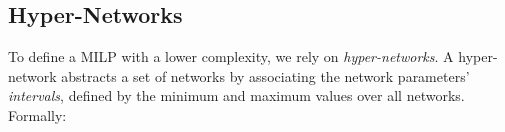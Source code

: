 \begin{comment}
Our minimal DP-DB bound is defined as the smallest bound above which no input causes the classifier $D$ to classify differently compared to any of the $|\mathcal{S}|$ classifiers $D'_{i \in [|\mathcal{S}|]}$. 
We compute this bound by addressing the dual problem identifying the maximal bound $\beta^*$ where at least one input causes classification differences, and then incrementing this by a very small number $\Delta$. This $\Delta$ represents a negligible quantity, reflecting the floating point precision. Namely, if $\beta^*$ is the maximal bound with classification differences, then $\beta^* + \Delta$ is the minimal bound without classification differences. We next formalize:

\begin{problem}[Minimal DP-DB bound]
\begin{equation}\label{problem}
  \begin{gathered}
     \max \beta^*\\%
     \text{subject to}\hspace{0.25cm}\hspace{6.1cm} \\
     \exists x.\; \text{ such that } 
     S_{D}^{\beta^*}(x,c)>\Delta\;\land
     \bigvee_{i\in[|\mathcal{S}|]}S_{D'_i}(x,c)\leq0
    \end{gathered}
\end{equation}
\end{problem}
\end{comment}

\subsection{Hyper-Networks}\label{sec:overview_hyper}
To define a MILP with a lower complexity, we rely on \emph{hyper-networks}.
%
A hyper-network abstracts a set of networks by associating the network parameters' \emph{intervals}, defined by the minimum and maximum values over all networks. Formally:

